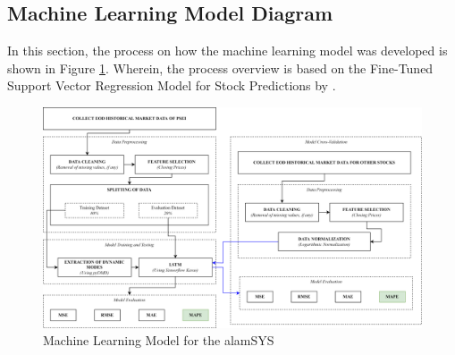 \subsection{Machine Learning Model Diagram}
\label{subsec:ml_diagram}
In this section, the process on how the machine learning model 
was developed is shown in Figure \ref{fig:ml_model}. 
Wherein, the process overview is based on the Fine-Tuned Support 
Vector Regression Model for Stock Predictions by 
.
\begin{figure}[ht]
    \centering
    \includegraphics[width=1\textwidth]{./assets/Chapter_3/Machine Learning Model.png}
    \caption{Machine Learning Model for the alamSYS}
    \label{fig:ml_model}
\end{figure}
\FloatBarrier

